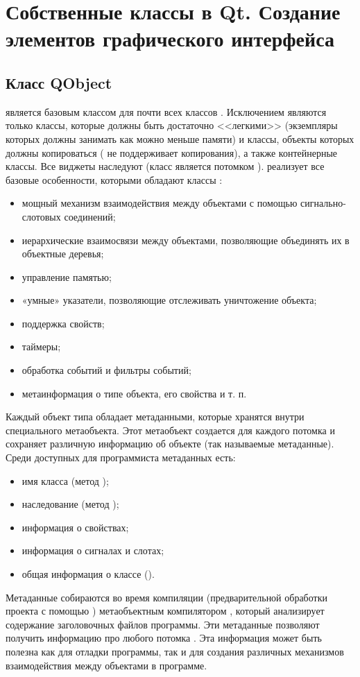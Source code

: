 \chapter[Создание элементов графического интерфейса]{Собственные классы в Qt.
Создание элементов графического интерфейса}
\section[Класс QObject]{Класс QObject}
 является базовым классом для почти всех классов . Исключением являются только
классы, которые должны быть достаточно <<легкими>> (экземпляры которых должны занимать как можно меньше
памяти) и классы, объекты которых должны копироваться ( не поддерживает копирования), а также
контейнерные классы. Все виджеты  наследуют  (класс  является потомком
).  реализует все базовые особенности, которыми обладают классы :

\begin{itemize}
\item мощный механизм взаимодействия между объектами с помощью сигнально-слотовых соединений;
\item иерархические взаимосвязи между объектами, позволяющие объединять их в объектные деревья;
\item управление памятью;
\item «умные» указатели, позволяющие отслеживать уничтожение объекта;
\item поддержка свойств;
\item таймеры;
\item обработка событий и фильтры событий;
\item метаинформация о типе объекта, его свойства и т. п.
\end{itemize}
Каждый объект типа  обладает метаданными, которые хранятся внутри специального
метаобъекта. Этот метаобъект создается для каждого потомка  и сохраняет
различную информацию об объекте (так называемые метаданные). Среди доступных для программиста метаданных есть:

\begin{itemize}
\item имя класса (метод );
\item наследование (метод );
\item информация о свойствах;
\item информация о сигналах и слотах;
\item общая информация о классе ().
\end{itemize}
Метаданные собираются во время компиляции (предварительной обработки проекта с помощью )
метаобъектным компилятором , который анализирует содержание заголовочных файлов программы. Эти метаданные
позволяют получить информацию про любого потомка . Эта информация может быть полезна как для отладки
программы, так и для создания различных механизмов взаимодействия между объектами в программе.

